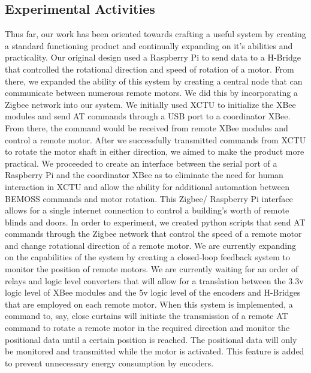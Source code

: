 \documentclass[letterpaper,12pt]{article}   %
\begin{document}
\subsection{Experimental Activities} \label{sec:expresults}
Thus far, our work has been oriented towards crafting a useful system by creating a standard functioning product and continually expanding on it's abilities and practicality. Our original design used a Raspberry Pi to send data to a H-Bridge that controlled the rotational direction and speed of rotation of a motor. From there, we expanded the ability of this system by creating a central node that can communicate between numerous remote motors. We did this by incorporating a Zigbee network into our system. We initially used XCTU to initialize the XBee modules and send AT commands through a USB port to a coordinator XBee. From there, the command would be received from remote XBee modules and control a remote motor. After we successfully transmitted commands from XCTU to rotate the motor shaft in either direction, we aimed to make the product more practical. We proceeded to create an interface between the serial port of a Raspberry Pi and the coordinator XBee as to eliminate the need for human interaction in XCTU and allow the ability for additional automation between BEMOSS commands and motor rotation. This Zigbee/ Raspberry Pi interface allows for a single internet connection to control a building's worth of remote blinds and doors. In order to experiment, we created python scripts that send AT commands through the Zigbee network that control the speed of a remote motor and change rotational direction of a remote motor. We are currently expanding on the capabilities of the system by creating a closed-loop feedback system to monitor the position of remote motors. We are currently waiting for an order of relays and logic level converters that will allow for a translation between the 3.3v logic level of XBee modules and the 5v logic level of the encoders and H-Bridges that are employed on each remote motor. When this system is implemented, a command to, say, close curtains will initiate the transmission of a remote AT command to rotate a remote motor in the required direction and monitor the positional data until a certain position is reached. The positional data will only be monitored and transmitted while the motor is activated. This feature is added to prevent unnecessary energy consumption by encoders. 
\end{document}
